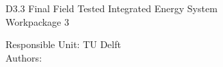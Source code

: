 
\begin{titlepage}

  \begin{center}
	
	\vspace*{-1.5cm}
    {\fontsize{36}{32}\selectfont\color{RedOrange}
        D3.3 Final Field Tested Integrated Energy System 
        \\ \vspace{.5cm}
		Workpackage 3
    }
	
	 \vfill
	 
    {\fontsize{18}{22}\color{RedOrange}
      Responsible Unit:  TU Delft
      \\ \vspace{.3cm}
      Authors: 
    }

  \end{center}

\end{titlepage}
